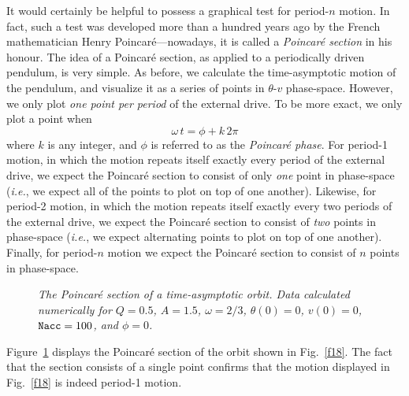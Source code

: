 It would certainly be helpful
to possess a graphical test for period-$n$ motion. In fact, such a test was developed more than a
 hundred years ago by the
French mathematician Henry Poincar\'{e}---nowadays, it is called a
{\em Poincar\'{e} section} in his honour. The idea of a  Poincar\'{e} section, as applied
to a periodically driven pendulum,  is very simple.
As before, we calculate the time-asymptotic motion of the pendulum, and visualize it as a
series of points in $\theta$-$v$
phase-space. However, we only plot {\em one point per period} of the external drive. To be more
exact, we only plot a point when
\begin{equation}
\omega\,t = \phi + k\,2\pi
\end{equation}
where $k$ is any integer, and $\phi$ is referred to as the {\em Poincar\'{e} phase}. 
For period-1 motion, in which the motion repeats itself exactly every period of the
external drive, we expect the Poincar\'{e} section to consist of only {\em one} point
in phase-space ({\em i.e.},  we expect all of the points to plot on top of one another). 
Likewise, for period-2 motion, in which the motion repeats itself exactly every two periods of the
external drive, we expect the Poincar\'{e} section to consist of  {\em two} points
in phase-space ({\em i.e.},  we expect alternating  points to plot on top of one another).
Finally, for period-$n$ motion we expect the Poincar\'{e} section to consist of  $n$ points
in phase-space.

\begin{figure}
\epsfysize=3in
\centerline{}
\caption{\em The Poincar\'{e} section of a time-asymptotic
orbit. Data calculated numerically for $Q=0.5$, $A=1.5$, $\omega=2/3$, $\theta(0)=0$,
$v(0)=0$, ${\tt Nacc} = 100$, and $\phi=0$. }\label{f19}
\end{figure}

Figure~\ref{f19} displays the Poincar\'{e} section of the orbit shown in Fig.~\ref{f18}. 
The fact that the section consists of a single point confirms that the motion
displayed in Fig.~\ref{f18} is indeed period-1 motion.


